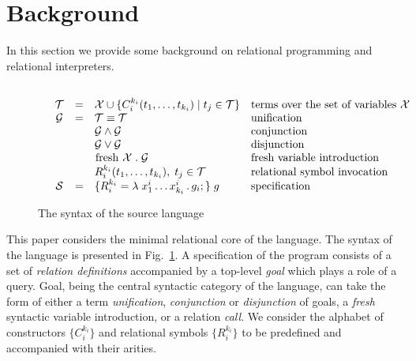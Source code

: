 \section{Background}
\label{background}

In this section we provide some background on relational programming and relational interpreters.

\subsection{\mk}
\label{mkIntro}

\begin{figure*}[t]
  \[
  \begin{array}{cccll}
    &\mathcal{T} & = & \mathcal{X} \cup \{C_i^{k_i} (t_1, \dots, t_{k_i}) \mid t_j\in\mathcal{T}\} & \mbox{terms over the set of variables $\mathcal{X}$} \\
    &\mathcal{G} & = & \mathcal{T}\equiv\mathcal{T}   &  \mbox{unification} \\
    &            &   & \mathcal{G}\wedge\mathcal{G}     & \mbox{conjunction} \\
    &            &   & \mathcal{G}\vee\mathcal{G}       &\mbox{disjunction} \\
    &            &   & \mbox{\lstinline|fresh|}\;\mathcal{X}\;.\;\mathcal{G} & \mbox{fresh variable introduction} \\
    &            &   & R_i^{k_i} (t_1,\dots,t_{k_i}),\;t_j\in\mathcal{T} & \mbox{relational symbol invocation} \\
    &\mathcal{S} & = & \{R_i^{k_i} = \lambda\;x_1^i\dots x_{k_i}^i\,.\, g_i;\}\; g & \mbox{specification}
  \end{array}
  \]
  \caption{The syntax of the source language}
  \label{syntax}
  \end{figure*}



This paper considers the minimal relational core of the \mk language.
The syntax of the language is presented in Fig.~\ref{syntax}.
A specification of the \mk program consists of a set of \emph{relation definitions} accompanied by a top-level \emph{goal} which plays a role of a query.
Goal, being the central syntactic category of the language, can take the form of either a term \emph{unification}, \emph{conjunction} or \emph{disjunction} of goals, a \emph{fresh} syntactic variable introduction, or a relation \emph{call}.
We consider the alphabet of constructors $\{C^{k_i}_i\}$ and relational symbols $\{R^{k_i}_i\}$ to be predefined and accompanied with their arities.

